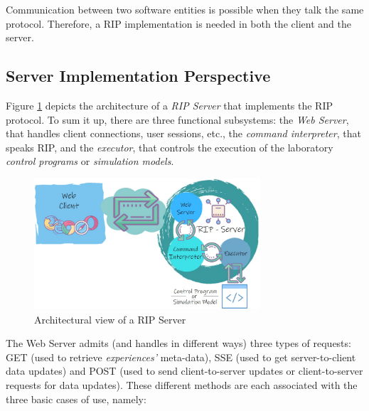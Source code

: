 Communication between two software entities is possible when they talk the same protocol. Therefore, a RIP implementation is needed in both the client and the server.

\subsection{Server Implementation Perspective}
Figure \ref{fig:RIP_Architecture} depicts the architecture of a \emph{RIP Server} that implements the RIP protocol. To sum it up, there are three functional subsystems: the \emph{Web Server}, that handles client connections, user sessions, etc., the \emph{command interpreter}, that speaks RIP, and the \emph{executor}, that controls the execution of the laboratory \textit{control programs} or \textit{simulation models}.

\begin{figure}
\centering
\includegraphics[width=0.75\textwidth]{images/RIPArchitecture.pdf}
\caption{Architectural view of a RIP Server}
\label{fig:RIP_Architecture}
\end{figure}

The Web Server admits (and handles in different ways) three types of requests: GET (used to retrieve \textit{experiences'} meta-data), SSE (used to get server-to-client data updates) and POST (used to send client-to-server updates or client-to-server requests for data updates). These different methods are each associated with the three basic cases of use, namely:

